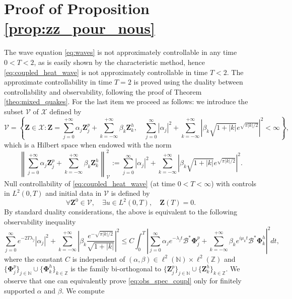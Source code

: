 \documentclass[10pt]{article}
\begin{document}
\appendix
\section{Proof of Proposition \ref{prop:zz_pour_nous}}\label{sec:app_proof_zz}
The wave equation \eqref{eq:waves} is not approximately controllable in any time $0 < T < 2$, as is easily shown by the characteristic method, hence \eqref{eq:coupled_heat_wave} is not approximately controllable in time $T < 2$. The approximate controllability in time $T = 2$ is proved using the duality between controllability and observability, following the proof of Theorem \ref{theo:mixed_quakes}. 
\newline
\newline
For the last item we proceed as follows: we introduce the subset $\mathcal{V}$ of $\mathcal{X}$ defined by 
\[
\mathcal{V} = \left\lbrace \mathbf{Z} \in \mathcal{X} : \mathbf{Z} = \sum_{j=0}^{+\infty} \alpha_j \mathbf{Z}_j^p + \sum_{k=-\infty}^{+\infty} \beta_k \mathbf{Z}_k^h,\quad  \sum_{j=0}^\infty |\alpha_j|^2 +  \sum_{k=-\infty}^{+\infty} \left| \beta_k \sqrt{1+|k|}e^{\sqrt{\pi |k|/2}} \right|^2   < \infty \right\rbrace,
\]
which is a Hilbert space when endowed with the norm 
\[
\left\| \sum_{j=0}^{+\infty} \alpha_j \mathbf{Z}_j^p + \sum_{k=-\infty}^{+\infty} \beta_k \mathbf{Z}_k^h \right\|_\mathcal{V}^2 := \sum_{j=0}^\infty |\alpha_j|^2 +  \sum_{k=-\infty}^{+\infty} \left| \beta_k \sqrt{1+|k|}e^{\sqrt{\pi |k|/2}} \right|^2.
\]
Null controllability of \eqref{eq:coupled_heat_wave} (at time $0 < T < \infty$) with controls in $L^2(0,T)$ and initial data in $\mathcal{V}$ is defined by 
\[
\forall \mathbf{Z}^0 \in \mathcal{V},\quad \exists u \in L^2(0,T),\quad \mathbf{Z}(T) = 0.
\]
By standard duality considerations, the above is equivalent to the following observability inequality
\begin{equation}\label{eq:obs_spec_coupl}
    \sum_{j = 0}^\infty e^{-2T \lambda_j}|\alpha_j|^2 + \sum_{k=-\infty}^{+\infty} \left| \beta_k \frac{e^{-\sqrt{\pi |k|/2}}}{\sqrt{1+|k|}} \right|^2 \leq C \int_0^T \left| \sum_{j = 0}^\infty \alpha_j e^{-\lambda_j t} \mathcal{B}^* \mathbf{\Phi}_j^p + \sum_{k = -\infty
}^{+\infty} \beta_k e^{i\mu_kt} \mathcal{B}^*\mathbf{\Phi}_k^h \right|^2 dt,
\end{equation}
where the constant $C$ is independent of $(\alpha , \beta) \in \ell^2(\mathbb{N}) \times \ell^2(\mathbb{Z})$ and $\{ \mathbf{\Phi}_j^p \}_{j \in \mathbb{N}} \cup \{ \mathbf{\Phi}_k^h \}_{k \in \mathbb{Z}}$ is the family bi-orthogonal to $\{ \mathbf{Z}_j^p \}_{j \in \mathbb{N}} \cup \{ \mathbf{Z}_k^h \}_{k \in \mathbb{Z}}$. We observe that one can equivalently prove \eqref{eq:obs_spec_coupl} only for finitely supported $\alpha$ and $\beta$. We compute 
\end{document}

